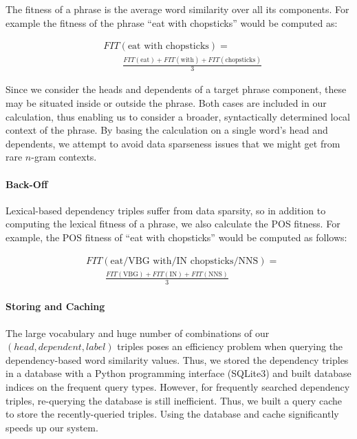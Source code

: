 \documentclass[11pt]{article}
\begin{document}
The fitness of a phrase is the average word similarity over all its components. For example the fitness of the phrase ``eat with chopsticks'' would be computed as:

\begin{align}
& FIT(\mbox{eat with chopsticks}) = \nonumber \\
 & \qquad \frac{FIT(\mbox{eat}) + FIT(\mbox{with}) + FIT(\mbox{chopsticks})}{3}
\end{align}

Since we consider the heads and dependents of a target phrase component, these
may be situated  inside or outside the phrase. Both cases are included in our
calculation, thus enabling us to consider a broader, syntactically determined
local context of the phrase.
By basing the calculation on a single word's head and dependents, we attempt to 
avoid data sparseness issues that we might get from rare $n$-gram contexts.

\paragraph{Back-Off}
Lexical-based dependency triples suffer from data sparsity, so in addition to computing the lexical fitness of a phrase, we also calculate the POS fitness. For example, the POS fitness of ``eat with chopsticks'' would be computed as follows:

\begin{align}
& FIT(\mbox{eat/VBG with/IN chopsticks/NNS}) = \nonumber \\
 & \qquad \frac{FIT(\mbox{VBG}) + FIT(\mbox{IN}) + FIT(\mbox{NNS})}{3} 
\end{align}



\paragraph{Storing and Caching}
The large vocabulary and huge number of combinations of our $(head, dependent, label)$ triples poses an efficiency problem when querying the dependency-based word similarity values. Thus, we stored the dependency triples in a database with a Python programming interface (SQLite3) and built database indices on the frequent query types. However, for frequently searched dependency triples, re-querying the database is still inefficient. Thus, we built a query cache to store the recently-queried triples. Using the database and cache significantly speeds up our system. 
\end{document}
